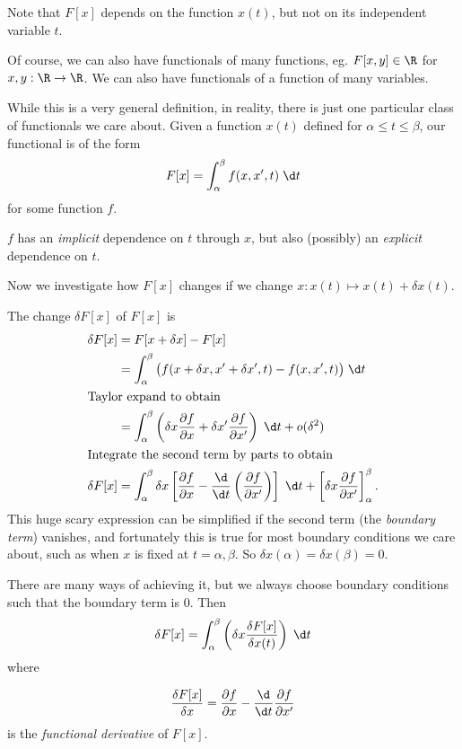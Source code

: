 \documentclass[a4paper]{article}
\begin{document}
Note that $F[x]$ depends on the function $x(t)$, but not on its independent variable $t$.

Of course, we can also have functionals of many functions, eg. $F[x, y]\in \R$ for $x, y: \R \to \R$. We can also have functionals of a function of many variables.

While this is a very general definition, in reality, there is just one particular class of functionals we care about. Given a function $x(t)$ defined for $\alpha \leq t \leq \beta$, our functional is of the form
\[
  F[x]  = \int_\alpha ^\beta f(x, x', t)\;\d t
\]
for some function $f$.

$f$ has an \emph{implicit} dependence on $t$ through $x$, but also (possibly) an \emph{explicit} dependence on $t$.

Now we investigate how $F[x]$ changes if we change $x: x(t) \mapsto x(t) + \delta x(t)$.

The change $\delta F[x]$ of $F[x]$ is
\begin{align*}
  \delta F[x] &= F[x + \delta x] - F[x]\\
  &= \int_\alpha ^\beta \big(f(x + \delta x, x' + \delta x', t) - f(x, x', t)\big)\;\d t\\
  \intertext{Taylor expand to obtain}
  &= \int_\alpha^\beta  \left(\delta x\frac{\partial f}{\partial x} + \delta x' \frac{\partial f}{\partial x'}\right)\;\d t + o(\delta^2)\\
  \intertext{Integrate the second term by parts to obtain}
  \delta F[x] &= \int_\alpha^\beta\delta x\left[\frac{\partial f}{\partial x} - \frac{\d}{\d t}\left(\frac{\partial f}{\partial x'}\right)\right]\;\d t + \left[ \delta x\frac{\partial f}{\partial x'}\right]_\alpha^\beta.
\end{align*}
This huge scary expression can be simplified if the second term (the \emph{boundary term}) vanishes, and fortunately this is true for most boundary conditions we care about, such as when $x$ is fixed at $t = \alpha, \beta$. So $\delta x(\alpha) = \delta x(\beta) = 0$.

There are many ways of achieving it, but we always choose boundary conditions such that the boundary term is 0. Then
\[
  \delta F[x] = \int_\alpha ^\beta \left(\delta x \frac{\delta F[x]}{\delta x(t)}\right)\;\d t
\]
where
\begin{defi}
  \[
    \frac{\delta F[x]}{\delta x} = \frac{\partial f}{\partial x} - \frac{\d }{\d t}\frac{\partial f}{\partial x'}
  \]
  is the \emph{functional derivative} of $F[x]$.
\end{defi}
\end{document}

